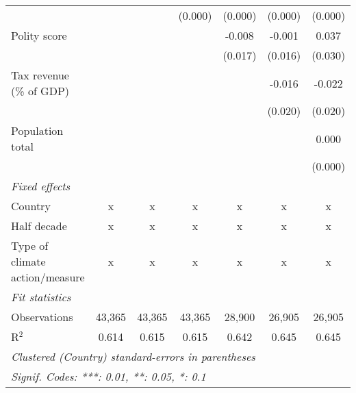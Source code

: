 \begin{tabular}{lcccccc}
                                                                                       &               &                & (0.000)        & (0.000)        & (0.000)        & (0.000)\\   
   Polity score                                                                        &               &                &                & -0.008         & -0.001         & 0.037\\   
                                                                                       &               &                &                & (0.017)        & (0.016)        & (0.030)\\   
   Tax revenue (\% of GDP)                                                             &               &                &                &                & -0.016         & -0.022\\   
                                                                                       &               &                &                &                & (0.020)        & (0.020)\\   
   Population total                                                                    &               &                &                &                &                & 0.000\\   
                                                                                       &               &                &                &                &                & (0.000)\\   
   \emph{Fixed effects}\\
   Country                                                                             & x             & x              & x              & x              & x              & x\\  
   Half decade                                                                         & x             & x              & x              & x              & x              & x\\  
   Type of climate action/measure                                                      & x             & x              & x              & x              & x              & x\\  
   \midrule \emph{Fit statistics}\\
   Observations                                                                        & 43,365        & 43,365         & 43,365         & 28,900         & 26,905         & 26,905\\  
   R$^2$                                                                               & 0.614         & 0.615          & 0.615          & 0.642          & 0.645          & 0.645\\  
   \midrule
   \multicolumn{7}{l}{\emph{Clustered (Country) standard-errors in parentheses}}\\
   \multicolumn{7}{l}{\emph{Signif. Codes: ***: 0.01, **: 0.05, *: 0.1}}\\
\end{tabular}
\par\endgroup


